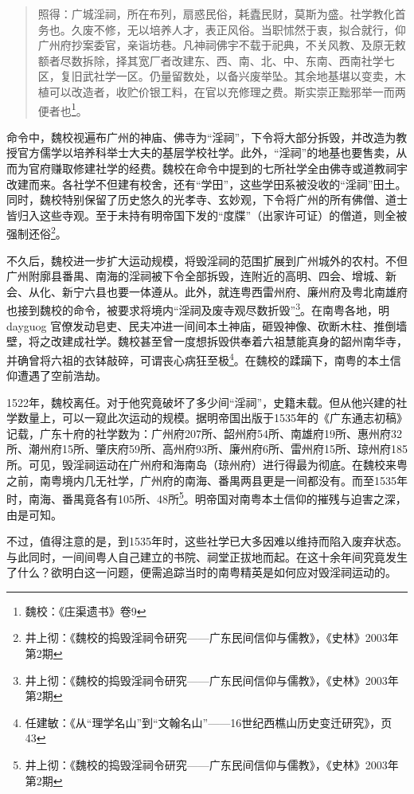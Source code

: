 \begin{quote}

照得：广城淫祠，所在布列，扇惑民俗，耗蠹民财，莫斯为盛。社学教化首务也。久废不修，无以培养人才，表正风俗。当职怵然于衷，拟合就行，仰广州府抄案委官，亲诣坊巷。凡神祠佛宇不载于祀典，不关风教、及原无敕额者尽数拆除，择其宽厂者改建东、西、南、北、中、东南、西南社学七区，复旧武社学一区。仍量留数处，以备兴废举坠。其余地基堪以变卖，木植可以改造者，收贮价银工料，在官以充修理之费。斯实崇正黜邪举一而两便者也\footnote{魏校：《庄渠遗书》卷9}。

\end{quote}

命令中，魏校视遍布广州的神庙、佛寺为“淫祠”，下令将大部分拆毁，并改造为教授官方儒学以培养科举士大夫的基层学校社学。此外，“淫祠”的地基也要售卖，从而为官府赚取修建社学的经费。魏校在命令中提到的七所社学全由佛寺或道教祠宇改建而来。各社学不但建有校舍，还有“学田”，这些学田系被没收的“淫祠”田土。同时，魏校特别保留了历史悠久的光孝寺、玄妙观，下令将广州的所有佛僧、道士皆归入这些寺观。至于未持有明帝国下发的“度牒”（出家许可证）的僧道，则全被强制还俗\footnote{井上彻：《魏校的捣毁淫祠令研究——广东民间信仰与儒教》，《史林》2003年第2期}。

不久后，魏校进一步扩大运动规模，将毁淫祠的范围扩展到广州城外的农村。不但广州附廓县番禺、南海的淫祠被下令全部拆毁，连附近的高明、四会、增城、新会、从化、新宁六县也要一体遵从。此外，就连粤西雷州府、廉州府及粤北南雄府也接到魏校的命令，被要求将境内“淫祠及废寺观尽数折毁”\footnote{井上彻：《魏校的捣毁淫祠令研究——广东民间信仰与儒教》，《史林》2003年第2期}。在南粤各地，明dayguog 官僚发动皂吏、民夫冲进一间间本土神庙，砸毁神像、砍断木柱、推倒墙壁，将之改建成社学。魏校甚至曾一度想拆毁供奉着六祖慧能真身的韶州南华寺，并确曾将六祖的衣钵敲碎，可谓丧心病狂至极\footnote{任建敏：《从“理学名山”到“文翰名山”——16世纪西樵山历史变迁研究》，页43}。在魏校的蹂躏下，南粤的本土信仰遭遇了空前浩劫。

1522年，魏校离任。对于他究竟破坏了多少间“淫祠”，史籍未载。但从他兴建的社学数量上，可以一窥此次运动的规模。据明帝国出版于1535年的《广东通志初稿》记载，广东十府的社学数为：广州府207所、韶州府54所、南雄府19所、惠州府32所、潮州府15所、肇庆府59所、高州府93所、廉州府6所、雷州府15所、琼州府185所。可见，毁淫祠运动在广州府和海南岛（琼州府）进行得最为彻底。在魏校来粤之前，南粤境内几无社学，广州府的南海、番禺两县更是一间都没有。而至1535年时，南海、番禺竟各有105所、48所\footnote{井上彻：《魏校的捣毁淫祠令研究——广东民间信仰与儒教》，《史林》2003年第2期}。明帝国对南粤本土信仰的摧残与迫害之深，由是可知。

不过，值得注意的是，到1535年时，这些社学已大多因难以维持而陷入废弃状态。与此同时，一间间粤人自己建立的书院、祠堂正拔地而起。在这十余年间究竟发生了什么？欲明白这一问题，便需追踪当时的南粤精英是如何应对毁淫祠运动的。

